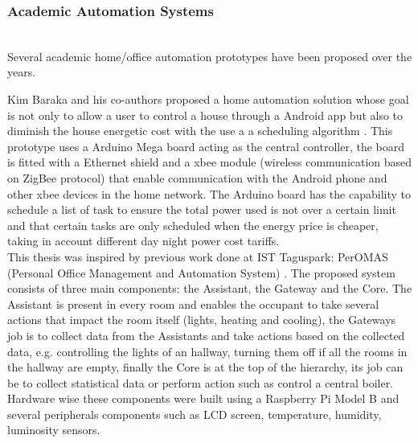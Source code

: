 



\subsubsection{Academic Automation Systems}\mbox{}\\

Several academic home/office automation prototypes have been proposed over the years.

Kim Baraka and his co-authors proposed a home automation solution whose goal is not only to allow a user to control a house through a Android app but also to diminish the house energetic cost with the use a a scheduling algorithm \cite{academic:arduino1}. This prototype uses a Arduino Mega board acting as the central controller, the board is fitted with a Ethernet shield and a xbee module (wireless communication based on ZigBee protocol) that enable communication with the Android phone and other xbee devices in the home network. The Arduino board has the capability to schedule a list of task to ensure the total power used is not over a certain limit and that certain tasks are only scheduled when the energy price is cheaper, taking in account different day night power cost tariffs.
\mbox{}\\

This thesis was inspired by previous work done at IST Taguspark: PerOMAS (Personal Office Management and Automation System) \cite{peromas}. The proposed system consists of three main components: the Assistant, the Gateway and the Core.  The Assistant is present in every room and enables the occupant to take several actions that impact the room itself (lights, heating and cooling), the Gateways job is to collect data from the Assistants and take actions based on the collected data, e.g. controlling the lights of an hallway, turning them off if all the rooms in the hallway are empty, finally the Core is at the top of the hierarchy, its job can be to collect statistical data or perform action such as control a central boiler. 
Hardware wise these components were built using a Raspberry Pi Model B and several peripherals components such as LCD screen, temperature, humidity, luminosity sensors.

